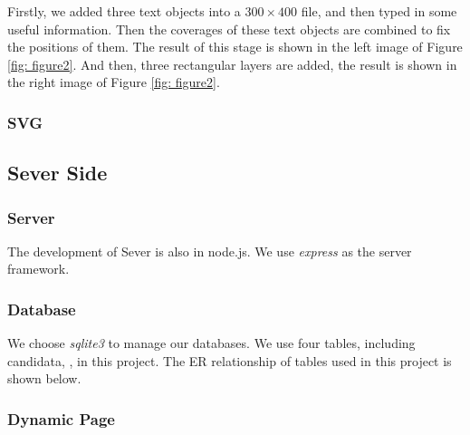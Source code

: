 \documentclass{article}
\begin{document}
\noindent
Firstly, we added three text objects into a $ 300 \times 400 $ file, and then 
typed in some useful information. Then the coverages of these text objects are
combined to fix the positions of them. The result of this stage is shown in the 
left image of Figure \ref{fig: figure2}. And then, three rectangular layers are 
added, the result is shown in the right image of Figure \ref{fig: figure2}. 



\subsubsection{SVG}

\subsection{Sever Side}
\subsubsection{Server}
The development of Sever is also in node.js. We use \textit{express} as the 
server framework.
\subsubsection{Database}
We choose \textit{sqlite3} to manage our databases. 
We use four tables, including candidata, , in this project.
The ER relationship of 
tables used in this project is shown below. 

\subsubsection{Dynamic Page}
    
\end{document}
